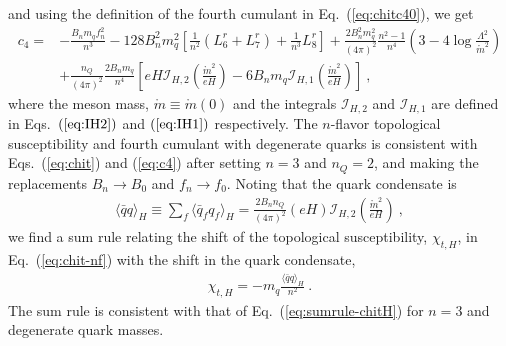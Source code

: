 \documentclass[12pt]{elsarticle}
\begin{document}
and using the definition of the fourth cumulant in Eq.~(\ref{eq:chitc40}), we get
\begin{equation}
\begin{split}
\label{eq:c4-nf}
c_{4}=&-\frac{B_{n}m_{q}f_{n}^{2}}{n^{3}}-128B_{n}^{2}m_{q}^{2}\left[\tfrac{1}{n^{2}}(L^{r}_{6}+L^{r}_{7})+\tfrac{1}{n^{3}}L^{r}_{8}\right]+\frac{2B_{n}^{2}m_{q}^{2}}{(4\pi)^{2}}\frac{n^{2}-1}{n^{4}}\left(3-4\log\frac{\Lambda^{2}}{\mathring{m}^{2}}\right)\\
&+\frac{n_{Q}}{(4\pi)^{2}}\frac{2B_{n}m_{q}}{n^{4}}\left[eH\mathcal{I}_{H,2}(\tfrac{\mathring{m}^{2}}{eH})-6B_{n}m_{q}\mathcal{I}_{H,1}(\tfrac{\mathring{m}^{2}}{eH})\right]\ ,
\end{split}
\end{equation}
where the meson mass, $\mathring{m}\equiv\mathring{m}(0)$ and the integrals $\mathcal{I}_{H,2}$ and $\mathcal{I}_{H,1}$ are defined in Eqs.~$(\ref{eq:IH2})$ and $(\ref{eq:IH1})$ respectively. The $n$-flavor topological susceptibility and fourth cumulant with degenerate quarks is consistent with Eqs.~(\ref{eq:chit}) and (\ref{eq:c4}) after setting $n=3$ and $n_{Q}=2$, and making the replacements $B_{n}\rightarrow B_{0}$ and $f_{n}\rightarrow f_{0}$. Noting that the quark condensate is
\begin{align}
\langle\bar{q}q\rangle_{H}\equiv\sum_{f}\langle \bar{q}_{f}q_{f}\rangle_{H}=\frac{2B_{n}n_{Q}}{(4\pi)^{2}}(eH)\mathcal{I}_{H,2}(\tfrac{\mathring{m}^{2}}{eH})\ ,
\end{align}
we find a sum rule relating the shift of the topological susceptibility, $\chi_{t,H}$, in Eq.~(\ref{eq:chit-nf}) with the shift in the quark condensate,
\begin{align}
\chi_{t,H}=-m_{q}\frac{\langle\bar{q}q\rangle_{H}}{n^{2}}\ .
\end{align}
The sum rule is consistent with that of Eq.~(\ref{eq:sumrule-chitH}) for $n=3$ and degenerate quark masses. 
\end{document}
